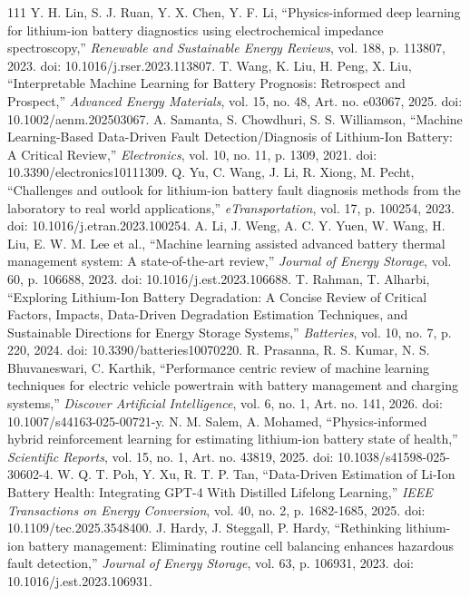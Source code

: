 \documentclass[journal]{IEEEtran}
\begin{document}
\begin{thebibliography}{111}
Y. H. Lin, S. J. Ruan, Y. X. Chen, Y. F. Li, ``Physics-informed deep learning for lithium-ion battery diagnostics using electrochemical impedance spectroscopy,'' \emph{Renewable and Sustainable Energy Reviews}, vol. 188, p. 113807, 2023. doi: 10.1016/j.rser.2023.113807.
T. Wang, K. Liu, H. Peng, X. Liu, ``Interpretable Machine Learning for Battery Prognosis: Retrospect and Prospect,'' \emph{Advanced Energy Materials}, vol. 15, no. 48, Art. no. e03067, 2025. doi: 10.1002/aenm.202503067.
A. Samanta, S. Chowdhuri, S. S. Williamson, ``Machine Learning-Based Data-Driven Fault Detection/Diagnosis of Lithium-Ion Battery: A Critical Review,'' \emph{Electronics}, vol. 10, no. 11, p. 1309, 2021. doi: 10.3390/electronics10111309.
Q. Yu, C. Wang, J. Li, R. Xiong, M. Pecht, ``Challenges and outlook for lithium-ion battery fault diagnosis methods from the laboratory to real world applications,'' \emph{eTransportation}, vol. 17, p. 100254, 2023. doi: 10.1016/j.etran.2023.100254.
A. Li, J. Weng, A. C. Y. Yuen, W. Wang, H. Liu, E. W. M. Lee et al., ``Machine learning assisted advanced battery thermal management system: A state-of-the-art review,'' \emph{Journal of Energy Storage}, vol. 60, p. 106688, 2023. doi: 10.1016/j.est.2023.106688.
T. Rahman, T. Alharbi, ``Exploring Lithium-Ion Battery Degradation: A Concise Review of Critical Factors, Impacts, Data-Driven Degradation Estimation Techniques, and Sustainable Directions for Energy Storage Systems,'' \emph{Batteries}, vol. 10, no. 7, p. 220, 2024. doi: 10.3390/batteries10070220.
R. Prasanna, R. S. Kumar, N. S. Bhuvaneswari, C. Karthik, ``Performance centric review of machine learning techniques for electric vehicle powertrain with battery management and charging systems,'' \emph{Discover Artificial Intelligence}, vol. 6, no. 1, Art. no. 141, 2026. doi: 10.1007/s44163-025-00721-y.
N. M. Salem, A. Mohamed, ``Physics-informed hybrid reinforcement learning for estimating lithium-ion battery state of health,'' \emph{Scientific Reports}, vol. 15, no. 1, Art. no. 43819, 2025. doi: 10.1038/s41598-025-30602-4.
W. Q. T. Poh, Y. Xu, R. T. P. Tan, ``Data-Driven Estimation of Li-Ion Battery Health: Integrating GPT-4 With Distilled Lifelong Learning,'' \emph{IEEE Transactions on Energy Conversion}, vol. 40, no. 2, p. 1682-1685, 2025. doi: 10.1109/tec.2025.3548400.
J. Hardy, J. Steggall, P. Hardy, ``Rethinking lithium-ion battery management: Eliminating routine cell balancing enhances hazardous fault detection,'' \emph{Journal of Energy Storage}, vol. 63, p. 106931, 2023. doi: 10.1016/j.est.2023.106931.

\end{thebibliography}
\end{document}
